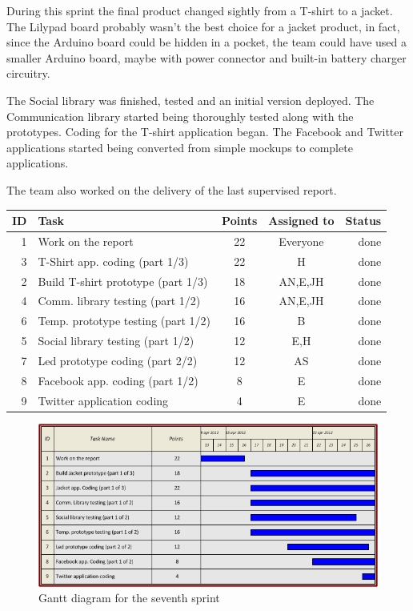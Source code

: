 During this sprint the final product changed sightly from a T-shirt to a jacket.
The Lilypad board probably wasn't the best choice for a jacket product, in fact,
since the Arduino board could be hidden in a pocket, the team could have used
a smaller Arduino board, maybe with power connector and built-in battery
charger circuitry.

The Social library was finished, tested and an initial version deployed.
The Communication library started being thoroughly tested along with the prototypes.
Coding for the T-shirt application began. The Facebook and Twitter applications
started being converted from simple mockups to complete applications.

The team also worked on the delivery of the last supervised report.

\begin{table}[ht!]
\begin{tabular}{ | r | l | c | c | r | }

\hline
\textbf{ID} & \textbf{Task} & \textbf{Points} & \textbf{Assigned to} & \textbf{Status} \\
\hline

1 & Work on the report							& 22 & Everyone		& done \\
\hline
3 & T-Shirt app. coding (part 1/3)				& 22 & H			& done \\
\hline
2 & Build T-shirt prototype (part 1/3)			& 18 & AN,E,JH		& done \\
\hline
4 & Comm. library testing (part 1/2)			& 16 & AN,E,JH		& done \\
\hline
6 & Temp. prototype testing (part 1/2)			& 16 & B			& done \\
\hline
5 & Social library testing (part 1/2)			& 12 & E,H			& done \\
\hline
7 & Led prototype coding (part 2/2)				& 12 & AS			& done \\
\hline
8 & Facebook app. coding (part 1/2)				& 8  & E			& done \\
\hline
9 & Twitter application coding					& 4  & E			& done \\
\hline

\end{tabular}
\end{table}

\begin{figure}[h!]
\centering \includegraphics[scale=0.8]{img/sprints-gantt7.png}
\caption{Gantt diagram for the seventh sprint}
\label{fig:sprints-gantt7}
\end{figure}

